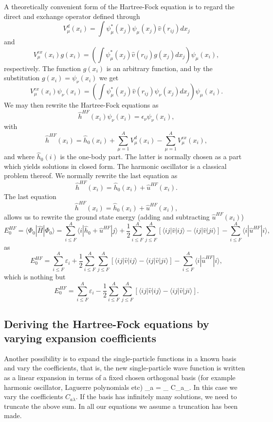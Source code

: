   A theoretically convenient form of the Hartree-Fock equation is to
  regard the direct and exchange operator defined through
\begin{equation*}
  V_{\mu}^{d}(x_i) = \int
  \psi_{\mu}^*(x_j)\psi_{\mu}(x_j)\hat{v}(r_{ij}) dx_j
\end{equation*}
and
\begin{equation*}
  V_{\mu}^{ex}(x_i) g(x_i) = \left(\int
  \psi_{\mu}^*(x_j)\hat{v}(r_{ij})g(x_j) dx_j \right)\psi_{\mu}(x_i),
\end{equation*}
respectively.  The function $g(x_i)$ is an arbitrary function, and by
the substitution $g(x_i) = \psi_{\nu}(x_i)$ we get
\begin{equation*}
  V_{\mu}^{ex}(x_i) \psi_{\nu}(x_i) = \left(\int \psi_{\mu}^*(x_j)
  \hat{v}(r_{ij})\psi_{\nu}(x_j) dx_j\right)\psi_{\mu}(x_i).
\end{equation*}
We may then rewrite the Hartree-Fock equations as
\[
  \hat{h}^{HF}(x_i) \psi_{\nu}(x_i) = \epsilon_{\nu}\psi_{\nu}(x_i),
\]
with
\[
  \hat{h}^{HF}(x_i)= \hat{h}_0(x_i) + \sum_{\mu=1}^AV_{\mu}^{d}(x_i) -
  \sum_{\mu=1}^AV_{\mu}^{ex}(x_i),
\]
and where $\hat{h}_0(i)$ is the one-body part. The latter is normally
chosen as a part which yields solutions in closed form. The harmonic
oscillator is a classical problem thereof.  We normally rewrite the
last equation as
\[
  \hat{h}^{HF}(x_i)= \hat{h}_0(x_i) + \hat{u}^{HF}(x_i).
\]
The last equation
\[
  \hat{h}^{HF}(x_i)= \hat{h}_0(x_i) + \hat{u}^{HF}(x_i),
\]
allows us to rewrite the ground state energy (adding and subtracting
$\hat{u}^{HF}(x_i)$)
\[
  E_0^{HF} =\langle \Phi_0 | \hat{H} | \Phi_0\rangle = \sum_{i\le F}^A
  \langle i | \hat{h}_0 +\hat{u}^{HF}| j\rangle+ \frac{1}{2}\sum_{i\le
    F}^A\sum_{j \le F}^A\left[\langle ij |\hat{v}|ij \rangle-\langle
    ij|\hat{v}|ji\rangle\right]-\sum_{i\le F}^A \langle i
  |\hat{u}^{HF}| i\rangle,
\]
as
\[
  E_0^{HF} = \sum_{i\le F}^A \varepsilon_i + \frac{1}{2}\sum_{i\le
    F}^A\sum_{j \le F}^A\left[\langle ij |\hat{v}|ij \rangle-\langle
    ij|\hat{v}|ji\rangle\right]-\sum_{i\le F}^A \langle i
  |\hat{u}^{HF}| i\rangle,
\]
which is nothing but
\[
  E_0^{HF} = \sum_{i\le F}^A \varepsilon_i - \frac{1}{2}\sum_{i\le
    F}^A\sum_{j \le F}^A\left[\langle ij |\hat{v}|ij \rangle-\langle
    ij|\hat{v}|ji\rangle\right].
\]

\subsection{Deriving the Hartree-Fock equations by varying expansion coefficients}
Another possibility is to expand the single-particle
functions in a known basis and vary the coefficients, that is, the new
single-particle wave function is written as a linear expansion in
terms of a fixed chosen orthogonal basis (for example harmonic
oscillator, Laguerre polynomials etc) \be \psi_a = \sum_{\lambda}
C_{a\lambda}\psi_{\lambda}.
\label{eq:newbasis}
\ee In this case we vary the coefficients $C_{a\lambda}$. If the basis
has infinitely many solutions, we need to truncate the above sum.  In
all our equations we assume a truncation has been made.

